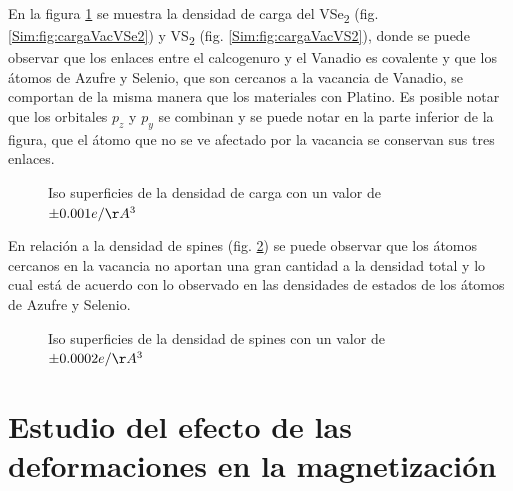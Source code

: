 \par En la figura \ref{Sim:fig:cargaVac} se muestra la densidad de carga del VSe\textsubscript{2} (fig. \ref{Sim:fig:cargaVacVSe2}) y VS\textsubscript{2} (fig. \ref{Sim:fig:cargaVacVS2}), donde  se puede observar que los enlaces entre el calcogenuro y el Vanadio es covalente y que los \'atomos de Azufre y Selenio, que son cercanos a la vacancia de Vanadio, se comportan de la misma manera que los materiales con Platino. Es posible notar que los orbitales $p_z$ y $p_y$ se combinan y se puede notar en la parte inferior de la figura, que el \'atomo que no se ve afectado por la vacancia se conservan sus tres enlaces. 
\begin{figure}[!hbt]
	\centering
  \caption[Densidad de electrones en el VSe\textsubscript{2} y VS\textsubscript{2} con vacancia de Vanadio.]{Iso superficies de la densidad de carga con  un valor de $\pm 0.001 e/\AA^3$}
  \label{Sim:fig:cargaVac}
\end{figure}
\newline
En relaci\'on a la densidad de spines (fig. \ref{Sim:fig:magzVacV}) se puede observar que los \'atomos cercanos en la vacancia no aportan una gran cantidad  a la densidad total y lo cual est\'a de acuerdo con lo observado en las densidades de estados de los \'atomos de Azufre y Selenio. 
\begin{figure}[!hbt]
	\centering
\caption[Densidad de spin en el VSe\textsubscript{2} y VS\textsubscript{2} con vacancia de Vanadio.]{Iso superficies de la densidad de spines con  un valor de $\pm 0.0002 e/\AA^3$}
\label{Sim:fig:magzVacV}
\end{figure}
\section{Estudio del efecto de las deformaciones en la magnetizaci\'on} \label{Sim:sec:Str}
